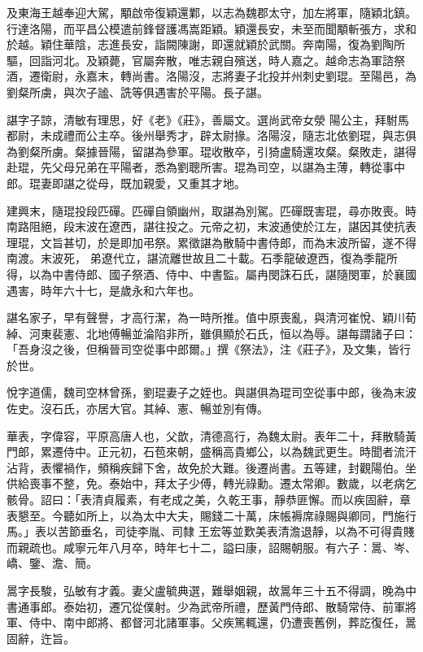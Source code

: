 \begin{pinyinscope}
 及東海王越奉迎大駕，顒啟帝復穎還鄴，以志為魏郡太守，加左將軍，隨穎北鎮。行達洛陽，而平昌公模遣前鋒督護馮嵩距穎。穎還長安，未至而聞顒斬張方，求和於越。穎住華陰，志進長安，詣闕陳謝，即還就穎於武關。奔南陽，復為劉陶所驅，回詣河北。及穎薨，官屬奔散，唯志親自殯送，時人嘉之。越命志為軍諮祭酒，遷衛尉，永嘉末，轉尚書。洛陽沒，志將妻子北投并州刺史劉琨。至陽邑，為劉粲所虜，與次子謐、詵等俱遇害於平陽。長子諶。



 諶字子諒，清敏有理思，好《老》《莊》，善屬文。選尚武帝女滎
 陽公主，拜駙馬都尉，未成禮而公主卒。後州舉秀才，辟太尉掾。洛陽沒，隨志北依劉琨，與志俱為劉粲所虜。粲據晉陽，留諶為參軍。琨收散卒，引猗盧騎還攻粲。粲敗走，諶得赴琨，先父母兄弟在平陽者，悉為劉聰所害。琨為司空，以諶為主薄，轉從事中郎。琨妻即諶之從母，既加親愛，又重其才地。



 建興末，隨琨投段匹磾。匹磾自領幽州，取諶為別駕。匹磾既害琨，尋亦敗喪。時南路阻絕，段末波在遼西，諶往投之。元帝之初，末波通使於江左，諶因其使抗表理琨，文旨甚切，於是即加弔祭。累徵諶為散騎中書侍郎，而為末波所留，遂不得南渡。末波死，
 弟遼代立，諶流離世故且二十載。石季龍破遼西，復為季龍所得，以為中書侍郎、國子祭酒、侍中、中書監。屬冉閔誅石氏，諶隨閔軍，於襄國遇害，時年六十七，是歲永和六年也。



 諶名家子，早有聲譽，才高行潔，為一時所推。值中原喪亂，與清河崔悅、穎川荀綽、河東裴憲、北地傅暢並淪陷非所，雖俱顯於石氏，恒以為辱。諶每謂諸子曰：「吾身沒之後，但稱晉司空從事中郎爾。」撰《祭法》，注《莊子》，及文集，皆行於世。



 悅字道儒，魏司空林曾孫，劉琨妻子之姪也。與諶俱為琨司空從事中郎，後為末波佐史。沒石氏，亦居大官。其綽、憲、暢並別有傳。



 華表，字偉容，平原高唐人也，父歆，清德高行，為魏太尉。表年二十，拜散騎黃門郎，累遷侍中。正元初，石苞來朝，盛稱高貴鄉公，以為魏武更生。時聞者流汗沾背，表懼禍作，頻稱疾歸下舍，故免於大難。後遷尚書。五等建，封觀陽伯。坐供給喪事不整，免。泰始中，拜太子少傅，轉光祿勳。遷太常卿。數歲，以老病乞骸骨。詔曰：「表清貞履素，有老成之美，久乾王事，靜恭匪懈。而以疾固辭，章表懇至。今聽如所上，以為太中大夫，賜錢二十萬，床帳褥席祿賜與卿同，門施行馬。」表以苦節垂名，司徒李胤、司隸
 王宏等並歎美表清澹退靜，以為不可得貴賤而親疏也。咸寧元年八月卒，時年七十二，謚曰康，詔賜朝服。有六子：暠、岑、嶠、鑒、澹、簡。



 暠字長駿，弘敏有才義。妻父盧毓典選，難舉姻親，故暠年三十五不得調，晚為中書通事郎。泰始初，遷冗從僕射。少為武帝所禮，歷黃門侍郎、散騎常侍、前軍將軍、侍中、南中郎將、都督河北諸軍事。父疾篤輒還，仍遭喪舊例，葬訖復任，暠固辭，迕旨。




\end{pinyinscope}
